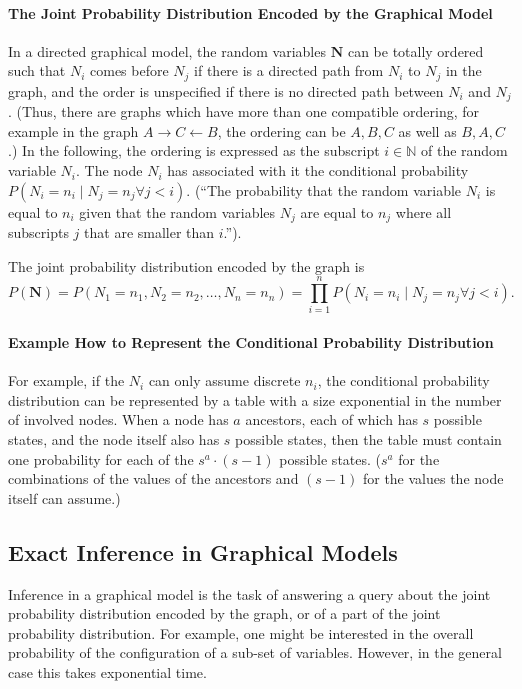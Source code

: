 \paragraph{The Joint Probability Distribution Encoded by the Graphical Model\label{par:The-Joint-Encoded-by-Directed-Graphical-Model}}

In a directed graphical model, the random variables $\mathbf{N}$
can be totally ordered such that $N_{i}$ comes before $N_{j}$ if
there is a directed path from $N_{i}$ to $N_{j}$ in the graph, and
the order is unspecified if there is no directed path between $N_{i}$
and $N_{j}$ \cite{Neal1992}. (Thus, there are graphs which have
more than one compatible ordering, for example in the graph $A\rightarrow C\leftarrow B$,
the ordering can be $A,B,C$ as well as $B,A,C$.) In the following,
the ordering is expressed as the subscript $i\in\mathbb{N}$ of the
random variable $N_{i}$. The node $N_{i}$ has associated with it
the conditional probability $P(N_{i}=n_{i}\mid N_{j}=n_{j}\forall j<i)$.
(``The probability that the random variable $N_{i}$ is equal to
$n_{i}$ given that the random variables \textbf{$N_{j}$ }are equal
to $n_{j}$ where all subscripts $j$ that are smaller than $i$.'').

The joint probability distribution encoded by the graph is
\[
P(\mathbf{N})=P(N_{1}=n_{1},N_{2}=n_{2},\dots,N_{n}=n_{n})=\prod_{i=1}^{n}P(N_{i}=n_{i}\mid N_{j}=n_{j}\forall j<i).
\]

\paragraph{Example How to Represent the Conditional Probability Distribution}

For example, if the $N_{i}$ can only assume discrete $n_{i}$, the
conditional probability distribution can be represented by a table
with a size exponential in the number of involved nodes. When a node
has $a$ ancestors, each of which has $s$ possible states, and the
node itself also has $s$ possible states, then the table must contain
one probability for each of the $s^{a}\cdot(s-1)$ possible states.
($s^{a}$ for the combinations of the values of the ancestors and
$(s-1)$ for the values the node itself can assume.)

\subsection{Exact Inference in Graphical Models}

Inference in a graphical model is the task of answering a query about
the joint probability distribution encoded by the graph, or of a part
of the joint probability distribution. For example, one might be interested
in the overall probability of the configuration of a sub-set of variables.
However, in the general case this takes exponential time.

